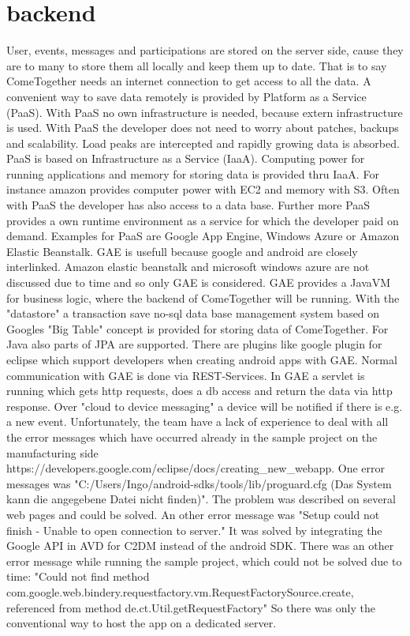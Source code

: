 \section{backend}\label{sec:backend}
User, events, messages and participations are stored on the server side, cause they are to many to store them all locally and keep them up to date. That is to say ComeTogether needs an internet connection to get access to all the data.
A convenient way to save data remotely is provided by Platform as a Service (PaaS).
With PaaS no own infrastructure is needed, because extern infrastructure is used.
With PaaS the developer does not need to worry about patches, backups and scalability.
Load peaks are intercepted and rapidly growing data is absorbed.
PaaS is based on Infrastructure as a Service (IaaA). Computing power for running applications and memory for storing data is provided thru IaaA.
For instance amazon provides computer power with EC2 and memory with S3. Often with PaaS the developer has also access to a data base.
Further more PaaS provides a own runtime environment as a service for which the developer paid on demand.
Examples for PaaS are Google App Engine, Windows Azure or Amazon Elastic Beanstalk.
GAE is usefull because google and android are closely interlinked. 
Amazon elastic beanstalk and microsoft windows azure are not discussed due to time and so only GAE is considered.
GAE provides a JavaVM for business logic, where the backend of ComeTogether will be running.
With the "datastore" a transaction save no-sql data base management system based on Googles "Big Table" concept is provided for storing data of ComeTogether. For Java also parts of JPA are supported.
There are plugins like google plugin for eclipse which support developers when creating android apps with GAE.
Normal communication with GAE is done via REST-Services.
In GAE a servlet is running which gets http requests, does a db access and return the data via http response.
Over "cloud to device messaging" a device will be notified if there is e.g. a new event.
Unfortunately, the team have a lack of experience to deal with all the error messages which have occurred already in the sample project on the manufacturing side
https://developers.google.com/eclipse/docs/creat\-ing\_new\_webapp.
One error messages was
"C:/Users/In\-go/android-sdks/tools/lib/proguard.cfg (Das System kann die angegebene Datei nicht finden)".
The problem was described on several web pages and could be solved.
An other error message was "Setup could not finish - Unable to open connection to server."
It was solved by integrating the Google API in AVD for C2DM instead of the android SDK.
There was an other error message while running the sample project, which could not be solved due to time: "Could not find method com.google.web.bindery.request\-factory.vm.Request\-FactorySource.create, referenced from method de.ct.Util.get\-Request\-Factory"
So there was only the conventional way to host the app on a dedicated server.